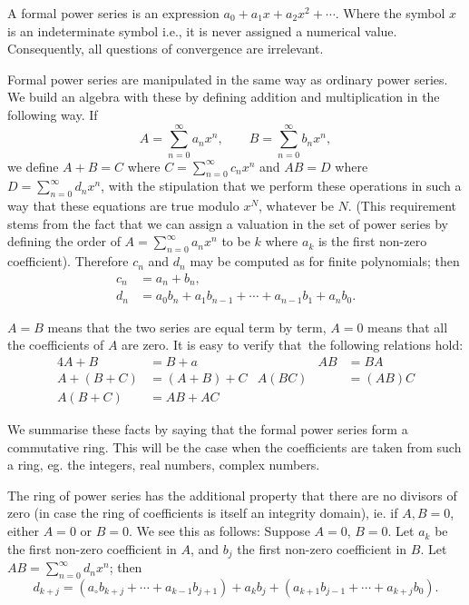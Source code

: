 A formal power series is an expression $a_0 + a_1 x+ a_2 x^2 +
\cdots$. Where the symbol $x$ is an indeterminate symbol i.e., it is
never assigned a numerical value. Consequently, all questions of
convergence are irrelevant.

Formal power series are manipulated in the same way as ordinary power
series. We build an algebra with these by defining addition and
multiplication in the following way. If 
$$
A= \sum\limits_{n=0}^\infty a_n  x^n, \qquad B=
\sum\limits_{n=0}^\infty b_n x^n,
$$
we define $A+B= C$ where $C=\sum\limits_{n=0}^\infty c_n x^n$ and
$AB=D$ where $D= \sum\limits_{n=0}^\infty d_n x^n$, with the
stipulation that we perform these operations in such a way that these
equations are true modulo $x^N$, whatever be $N$. (This requirement
stems from the fact that we can assign a valuation in the set of power
series by defining the order of $A= \sum\limits_{n=0}^\infty a_n x^n$
to be $k$ where $a_k$ is the first non-zero coefficient). Therefore
$c_n$ and $d_n$ may be computed as for finite polynomials; then
\begin{align*}
  c_n & = a_n + b_n,\\
  d_n & = a_0 b_n + a_1 b_{n-1}+ \cdots + a_{n-1} b_1 + a_n b_0. 
\end{align*}

$A=B$ means that the two series are equal term by term, $A=0$ means
that all the coefficients of $A$ are zero. It is easy to verify
that\pageoriginale\  the following relations hold:
\begin{alignat*}{4}
  A+B &= B+a & \hspace{2cm}  AB& = BA\\
  A+ (B+C) & = (A+B)+C & A(BC) & = (AB) C\\
  A(B+C) & = AB+ AC
\end{alignat*}

We summarise these facts by saying that the formal power series form a
commutative ring. This will be the case when the coefficients are
taken from such a ring, eg. the integers, real numbers, complex
numbers.

The ring of power series has the additional property that there are no
divisors of zero (in case the ring of coefficients is itself an
integrity domain), ie. if $A,B =0$, either $A= 0$ or $B=
0$. We see this as follows: Suppose $A= 0$, $B= 0$. Let
$a_k$ be the first non-zero coefficient in $A$, and $b_j$ the first
non-zero coefficient in $B$. Let $AB= \sum\limits_{n=0}^\infty d_n
x^n$; then
$$
d_{k+j} = \left( a_\circ b_{k+j} + \cdots + a_{k-1} b_{j+1}\right) +
a_k b_j + \left(a_{k+1} b_{j-1}+ \cdots + a_{k+j} b_0\right). 
$$

